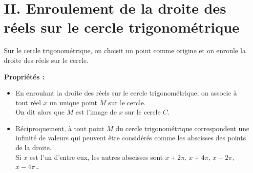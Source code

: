\documentclass[11pt,a4paper]{article}
\begin{document}
\newpage

\section*{II. Enroulement de la droite des réels sur le cercle trigonométrique}

Sur le cercle trigonométrique, on choisit un point comme origine et on enroule la droite des réels sur le cercle.

\begin{center}
\end{center}


\begin{mdframed}[style=proprieteStyle]
    \textbf{Propriétés :}
    \vspace{-4pt}
    \begin{itemize}
        \item En enroulant la droite des réels sur le cercle trigonométrique, on associe à tout réel $x$ un unique point $M$ sur le cercle. \\
              On dit alors que $M$ est l'image de $x$ sur le cercle $C$.
        \item Réciproquement, à tout point $M$ du cercle trigonométrique correspondent une infinité de valeurs qui peuvent être considérés comme les abscisses des points de la droite. \\
              Si $x$ est l'un d'entre eux, les autres abscisses sont $x+2\pi$, $x+4\pi$, $x-2\pi$, $x-4\pi$\dots
    \end{itemize}
\end{mdframed}
\end{document}
